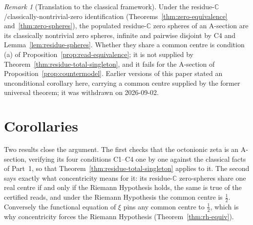 \documentclass[11pt]{article}
\newcommand{\CC}{\mathbb{C}}
\theoremstyle{plain}
\theoremstyle{definition}
\theoremstyle{remark}
\newtheorem{remark}[theorem]{Remark}
\begin{document}
\begin{remark}[Translation to the classical framework]\label{rmk:nontrivial}
Under the residue-$\CC$/classically-nontrivial-zero identification
\textup{(}Theorems~\ref{thm:zero-equivalence} and~\ref{thm:zero-spheres}\textup{)}, the
populated residue-$\CC$ zero spheres of an A-section are its classically nontrivial zero spheres,
infinite and pairwise disjoint by \textup{C4} and Lemma~\ref{lem:residue-spheres}. Whether they
share a common centre is condition (a) of Proposition~\ref{prop:read-equivalence}; it is not
supplied by Theorem~\ref{thm:residue-total-singleton}, and it fails for the A-section of
Proposition~\ref{prop:countermodel}. Earlier versions of this paper stated an unconditional
corollary here, carrying a common centre supplied by the former universal theorem; it was
withdrawn on 2026-09-02.
\end{remark}


\section{Corollaries}\label{sec:verification}

Two results close the argument. The first checks that the octonionic zeta is an A-section,
verifying its four conditions C1--C4 one by one against the classical facts of Part~1, so that
Theorem~\ref{thm:residue-total-singleton} applies to it. The second says exactly what
concentricity means for it: its residue-$\CC$ zero-spheres share one real centre if and only if
the Riemann Hypothesis holds, the same is true of the certified reads, and under the Riemann
Hypothesis the common centre is $\tfrac12$. Conversely the functional equation of $\xi$ pins any
common centre to $\tfrac12$, which is why concentricity forces the Riemann Hypothesis
(Theorem~\ref{thm:rh-equiv}).
\end{document}
